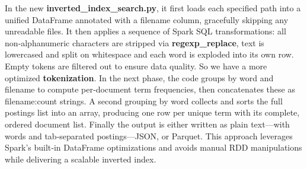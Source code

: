 In the new \textbf{inverted\_index\_search.py}, it first loads each specified path into a unified DataFrame annotated with a filename column, gracefully skipping any unreadable files. It then applies a sequence of Spark SQL transformations: all non‐alphanumeric characters are stripped via \textbf{regexp\_replace}, text is lowercased and split on whitespace and each word is exploded into its own row. Empty tokens are filtered out to ensure data quality. So we have a more optimized \textbf{tokenization}. In the next phase, the code groups by word and filename to compute per‐document term frequencies, then concatenates these as filename:count strings. A second grouping by word collects and sorts the full postings list into an array, producing one row per unique term with its complete, ordered document list. Finally the output is either written as plain text—with words and tab‐separated postings—JSON, or Parquet. This approach leverages Spark’s built‐in DataFrame optimizations and avoids manual RDD manipulations while delivering a scalable inverted index. 




